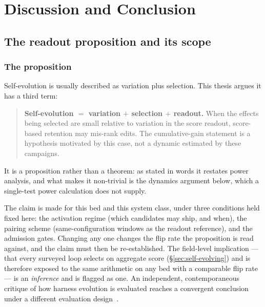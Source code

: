 \chapter{Discussion and Conclusion}
\label{ch:discussion}
\label{ch:conclusion}


\section{The readout proposition and its scope}
\label{sec:proposition}

\subsection*{The proposition}

Self-evolution is usually described as variation plus selection. This
thesis argues it has a third term:

\begin{quote}
\textbf{Self-evolution $=$ variation $+$ selection $+$ readout.} When the
effects being selected are small relative to variation in the score
readout, score-based retention may mis-rank edits. The cumulative-gain
statement is a hypothesis motivated by this case, not a dynamic estimated
by these campaigns.
\end{quote}

It is a proposition rather than a theorem: as stated in words it restates
power analysis, and what makes it non-trivial is the dynamics argument
below, which a single-test power calculation does not supply.

The claim is made for this bed and this system class, under three
conditions held fixed here: the activation regime (which candidates may
ship, and when), the pairing scheme (same-configuration windows as the
readout reference), and the admission gates. Changing any one changes the
flip rate the proposition is read against, and the claim must then be
re-established. The field-level
implication --- that every surveyed loop selects on aggregate score
(\S\ref{sec:self-evolving}) and is therefore exposed to the same
arithmetic on any bed with a comparable flip rate --- is an \emph{inference}
and is flagged as one.  An independent, contemporaneous
critique of how harness evolution is evaluated reaches a convergent
conclusion under a different evaluation design~\cite{rethink-harness-eval}.

